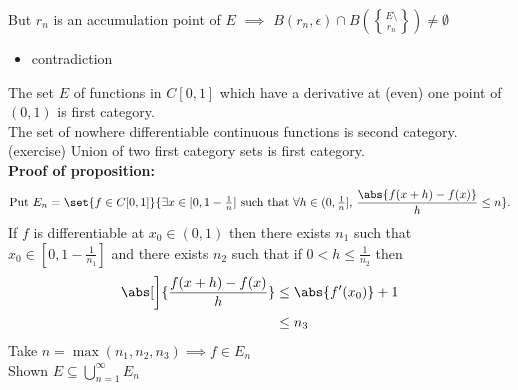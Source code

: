 But $r_n$ is an accumulation point of $E$ $\implies$ $B(r_n,\epsilon)\cap B(E\setminus\brace{r_n})\neq\emptyset$
\begin{itemize}
\item contradiction
\end{itemize}
\prop The set $E$ of functions in $C[0,1]$ which have a derivative at (even) one point of $(0,1)$ is first category. \\
\cor The set of nowhere differentiable continuous functions is second category. \\
\pf (exercise) Union of two first category sets is first category. \\
\textbf{Proof of proposition: }
\[ \text{Put } E_n=\set{f\in C[0,1]}{\exists x\in[0,1-\tfrac1n]\text{ such that }\forall h\in(0,\tfrac1n]\text{, }\frac{\abs{f(x+h)-f(x)}}{h}\leq n} . \]
If $f$ is differentiable at $x_0\in(0,1)$ then there exists $n_1$ such that $x_0\in[0,1-\frac{1}{n_1}]$ and there exists $n_2$ such that if $0<h\leq\frac{1}{n_2}$ then
\begin{align*}
\abs[\bigg]{\frac{f(x+h)-f(x)}{h}} &\leq \abs{f'(x_0)}+1 \\
&\leq n_3
\end{align*}
Take $n=\max(n_1,n_2,n_3)\implies f\in E_n$ \\
Shown $E\subseteq\bigcup_{n=1}^\infty E_n$